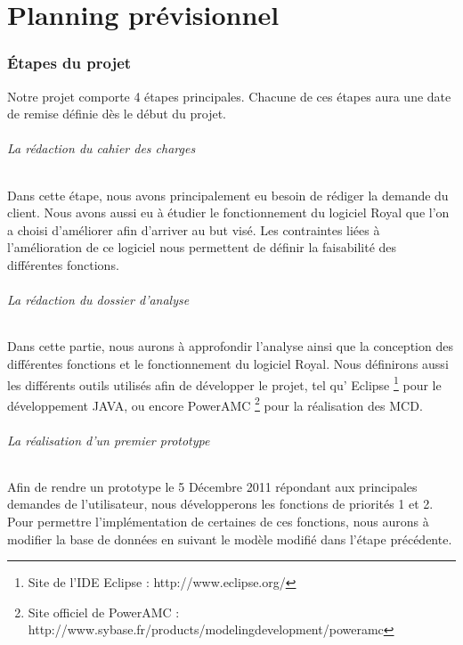\part{Planning prévisionnel}

\section{Étapes du projet}

Notre projet comporte 4 étapes principales. Chacune de ces étapes aura une date de remise définie dès le début du projet. 

\paragraph{La rédaction du cahier des charges}

Dans cette étape, nous avons principalement eu besoin de rédiger la demande du client. 
Nous avons aussi eu à étudier le fonctionnement du logiciel Royal que l'on a choisi d'améliorer afin d'arriver au but visé.
Les contraintes liées à l'amélioration de ce logiciel nous permettent de définir la faisabilité des différentes fonctions. 

\paragraph{La rédaction du dossier d'analyse}

Dans cette partie, nous aurons à approfondir l'analyse ainsi que la conception des différentes fonctions et le fonctionnement du logiciel Royal. 
Nous définirons aussi les différents outils utilisés afin de développer le projet, tel qu' 
Eclipse \footnote{Site de l'IDE Eclipse : http://www.eclipse.org/} 
pour le développement JAVA, ou encore 
PowerAMC \footnote{Site officiel de PowerAMC : http://www.sybase.fr/products/modelingdevelopment/poweramc}
pour la réalisation des MCD.

\paragraph{La réalisation d'un premier prototype}

Afin de rendre un prototype le 5 Décembre 2011 répondant aux principales demandes de l'utilisateur, nous développerons les fonctions de priorités 1 et 2.
Pour permettre l'implémentation de certaines de ces fonctions, nous aurons à modifier la base de données en suivant le modèle modifié dans l'étape précédente.  

